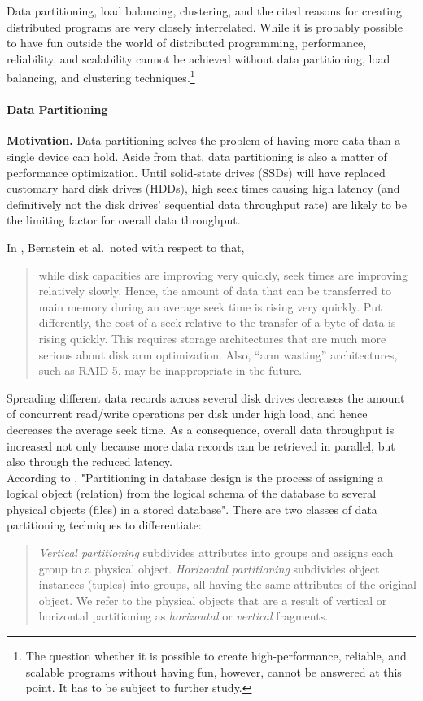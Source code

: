 Data partitioning, load balancing, clustering, and the cited reasons for creating distributed programs are very closely interrelated. While it is probably possible to have fun outside the world of distributed programming, performance, reliability, and scalability cannot be achieved without data partitioning, load balancing, and clustering techniques.\footnote{The question whether it is possible to create high-performance, reliable, and scalable programs without having fun, however, cannot be answered at this point. It has to be subject to further study.}

\paragraph{Data Partitioning}
{\bf Motivation.} Data partitioning solves the problem of having more data than a single device can hold. Aside from that, data partitioning is also a matter of performance optimization. Until solid-state drives (SSDs) will have replaced customary hard disk drives (HDDs), high seek times causing high latency (and definitively not the disk drives' sequential data throughput rate) are likely to be the limiting factor for overall data throughput.

In \cite{BBC+98}, Bernstein et al.\ noted with respect to that,
\begin{quote}
	while disk capacities are improving very quickly, seek times are improving relatively slowly. Hence, the amount of data that can be transferred to main memory during an average seek time is rising very quickly. Put differently, the cost of a seek relative to the transfer of a byte of data is rising quickly. This requires storage architectures that are much more serious about disk arm optimization. Also, ``arm wasting'' architectures, such as RAID 5, may be inappropriate in the future.
\end{quote}

Spreading different data records across several disk drives decreases the amount of concurrent read/write operations per disk under high load, and hence decreases the average seek time. As a consequence, overall data throughput is increased not only because more data records can be retrieved in parallel, but also through the reduced latency.\\

\noindent
According to \cite{NCWD84}, "Partitioning in database design is the process of assigning a logical object (relation) from the logical schema of the database to several physical objects (files) in a stored database". There are two classes of data partitioning techniques to differentiate:
\begin{quote}
	\emph{Vertical partitioning} subdivides attributes into groups and assigns each group to a physical object. \emph{Horizontal partitioning} subdivides object instances (tuples) into groups, all having the same attributes of the original object. We refer to the physical objects that are a result of vertical or horizontal partitioning as \emph{horizontal} or \emph{vertical} fragments.
\end{quote}

